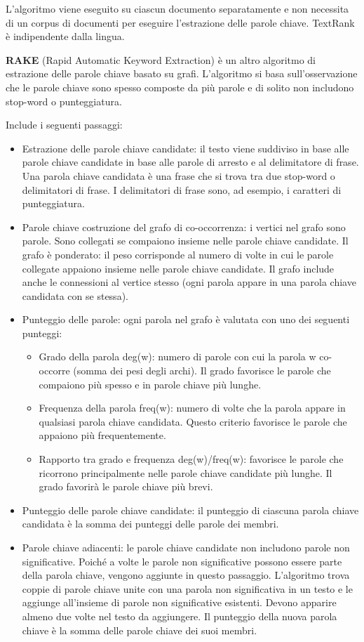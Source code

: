 L'algoritmo viene eseguito su ciascun documento separatamente e non necessita di un corpus di documenti per eseguire l'estrazione delle parole chiave. TextRank è indipendente dalla lingua.

\textbf{RAKE} (Rapid Automatic Keyword Extraction) è un altro algoritmo di estrazione delle parole chiave basato su grafi. L'algoritmo si basa sull'osservazione che le parole chiave sono spesso composte da più parole e di solito non includono stop-word o punteggiatura.

Include i seguenti passaggi:
\begin{itemize}
\item Estrazione delle parole chiave candidate: il testo viene suddiviso in base alle parole chiave candidate in base alle parole di arresto e al delimitatore di frase. Una parola chiave candidata è una frase che si trova tra due stop-word o delimitatori di frase. I delimitatori di frase sono, ad esempio, i caratteri di punteggiatura.
\item Parole chiave costruzione del grafo di co-occorrenza: i vertici nel grafo sono parole. Sono collegati se compaiono insieme nelle parole chiave candidate. Il grafo è ponderato: il peso corrisponde al numero di volte in cui le parole collegate appaiono insieme nelle parole chiave candidate. Il grafo include anche le connessioni al vertice stesso (ogni parola appare in una parola chiave candidata con se stessa).
\item Punteggio delle parole: ogni parola nel grafo è valutata con uno dei seguenti punteggi: 
\begin{itemize}
\item Grado della parola deg(w): numero di parole con cui la parola w co-occorre (somma dei pesi degli archi). Il grado favorisce le parole che compaiono più spesso e in parole chiave più lunghe.
\item Frequenza della parola freq(w): numero di volte che la parola appare in qualsiasi parola chiave candidata. Questo criterio favorisce le parole che appaiono più frequentemente.
\item Rapporto tra grado e frequenza deg(w)/freq(w): favorisce le parole che ricorrono principalmente nelle parole chiave candidate più lunghe. Il grado favorirà le parole chiave più brevi.
\end{itemize}
\item Punteggio delle parole chiave candidate: il punteggio di ciascuna parola chiave candidata è la somma dei punteggi delle parole dei membri.
\item Parole chiave adiacenti: le parole chiave candidate non includono parole non significative. Poiché a volte le parole non significative possono essere parte della parola chiave, vengono aggiunte in questo passaggio. L'algoritmo trova coppie di parole chiave unite con una parola non significativa in un testo e le aggiunge all'insieme di parole non significative esistenti. Devono apparire almeno due volte nel testo da aggiungere. Il punteggio della nuova parola chiave è la somma delle parole chiave dei suoi membri.

\end{itemize}
